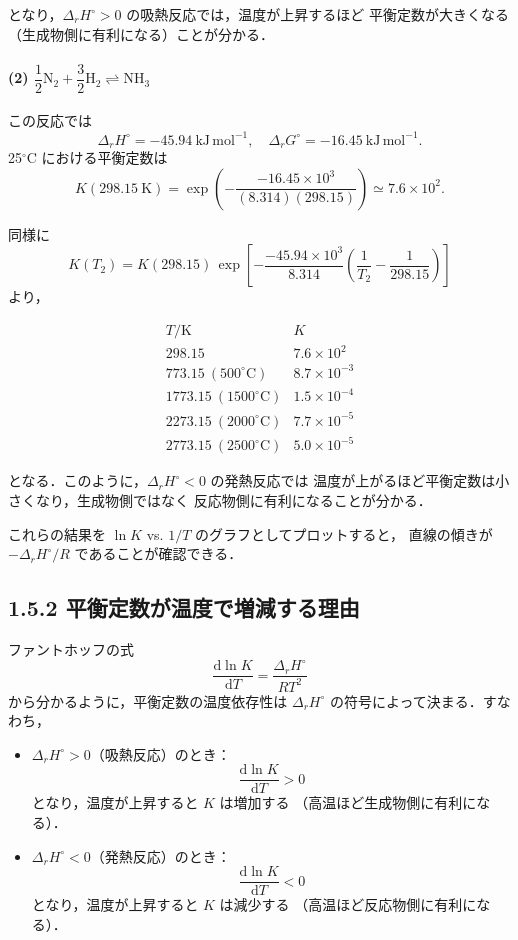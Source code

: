 \documentclass[a4paper,12pt]{jlreq}
\begin{document}
となり，\(\Delta_r H^\circ>0\) の吸熱反応では，温度が上昇するほど
平衡定数が大きくなる（生成物側に有利になる）ことが分かる．

\paragraph{(2) \(\dfrac12\mathrm{N_2} + \dfrac32\mathrm{H_2} \rightleftharpoons \mathrm{NH_3}\)}

この反応では
\[
 \Delta_r H^\circ = -45.94\ \mathrm{kJ\,mol^{-1}},
\quad
 \Delta_r G^\circ = -16.45\ \mathrm{kJ\,mol^{-1}}.
\]
25\(^\circ\mathrm{C}\) における平衡定数は
\[
 K(298.15\ \mathrm{K})
 = \exp\left(-\frac{-16.45\times10^3}{(8.314)(298.15)}\right)
 \simeq 7.6\times10^{2}.
\]

同様に
\[
 K(T_2)
 = K(298.15)\,
   \exp\left[
     -\frac{-45.94\times10^3}{8.314}
      \left(\frac{1}{T_2}-\frac{1}{298.15}\right)
   \right]
\]
より，

\[
\begin{array}{c|c}
 T / \mathrm{K} & K \\
\hline
298.15 & 7.6\times10^{2} \\
773.15\ (500^\circ\mathrm{C}) & 8.7\times10^{-3} \\
1773.15\ (1500^\circ\mathrm{C}) & 1.5\times10^{-4} \\
2273.15\ (2000^\circ\mathrm{C}) & 7.7\times10^{-5} \\
2773.15\ (2500^\circ\mathrm{C}) & 5.0\times10^{-5}
\end{array}
\]

となる．このように，\(\Delta_r H^\circ<0\) の発熱反応では
温度が上がるほど平衡定数は小さくなり，生成物側ではなく
反応物側に有利になることが分かる．  

これらの結果を \(\ln K\) vs. \(1/T\) のグラフとしてプロットすると，
直線の傾きが \(-\Delta_r H^\circ/R\) であることが確認できる．


\subsection*{1.5.2 平衡定数が温度で増減する理由}

ファントホッフの式
\[
 \frac{\mathrm d\ln K}{\mathrm dT}
 = \frac{\Delta_r H^\circ}{RT^2}
\]
から分かるように，平衡定数の温度依存性は
\(\Delta_r H^\circ\) の符号によって決まる．すなわち，

\begin{itemize}
  \item \(\Delta_r H^\circ > 0\)（吸熱反応）のとき：
    \[
      \frac{\mathrm d\ln K}{\mathrm dT} > 0
    \]
    となり，温度が上昇すると \(K\) は増加する
    （高温ほど生成物側に有利になる）．
  \item \(\Delta_r H^\circ < 0\)（発熱反応）のとき：
    \[
      \frac{\mathrm d\ln K}{\mathrm dT} < 0
    \]
    となり，温度が上昇すると \(K\) は減少する
    （高温ほど反応物側に有利になる）．
\end{itemize}
\end{document}
